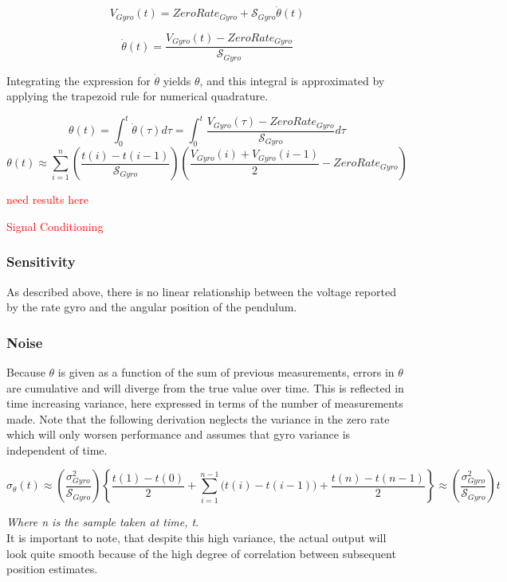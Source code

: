 \documentclass{article}
\newcommand{\xxx}[1]{\textcolor{red}{#1}}
\theoremstyle{plain}
\theoremstyle{definition}
\theoremstyle{remark}
\newcommand{\Sens}{\mathcal{S}}
\begin{document}
$$V_{Gyro}(t) = ZeroRate_{Gyro} + \Sens_{Gyro} \dot{\theta}(t) $$

$$\dot{\theta}(t) = \frac{V_{Gyro}(t) - ZeroRate_{Gyro}}{\Sens_{Gyro}} $$

Integrating the expression for $\dot{\theta}$ yields $\theta$, and this integral is approximated by applying the trapezoid rule for numerical quadrature.

$$ \theta(t) = \int_0^t \dot{\theta}(\tau) d\tau = \int_0^t \frac{V_{Gyro}(\tau) - ZeroRate_{Gyro}}{\Sens_{Gyro}} d\tau$$
$$ \theta(t) \approx \sum_{i=1}^n \left(\frac{t(i) - t(i-1)}{ \Sens_{Gyro}} \right) \left( \frac{V_{Gyro}(i) + V_{Gyro}(i - 1)}{2} - ZeroRate_{Gyro} \right) $$

\xxx{need results here}

\xxx{Signal Conditioning}

\subsubsection{Sensitivity}

As described above, there is no linear relationship between the voltage reported by the rate gyro and the angular position of the pendulum.  

\subsubsection{Noise}

Because $\theta$ is given as a function of the sum of previous measurements, errors in $\theta$ are cumulative and will diverge from the true value over time.  This is reflected in time increasing variance, here expressed in terms of the number of measurements made.  Note that the following derivation neglects the variance in the zero rate which will only worsen performance and assumes that gyro variance is independent of time.

$$ \sigma_{\theta}(t) \approx \left( \frac{\sigma_{Gyro}^2}{\Sens_{Gyro}} \right) \left\{ \frac{t(1) - t(0)}{2} + \sum_{i = 1}^{n-1} \big( t(i) - t(i-1) \big) + \frac{t(n) - t(n-1)}{2} \right\} \approx \left( \frac{\sigma_{Gyro}^2}{\Sens_{Gyro}} \right) t$$

\emph{Where n is the sample taken at time, t.} \\

It is important to note, that despite this high variance, the actual output will look quite smooth because of the high degree of correlation between subsequent position estimates.  \\
\end{document}
